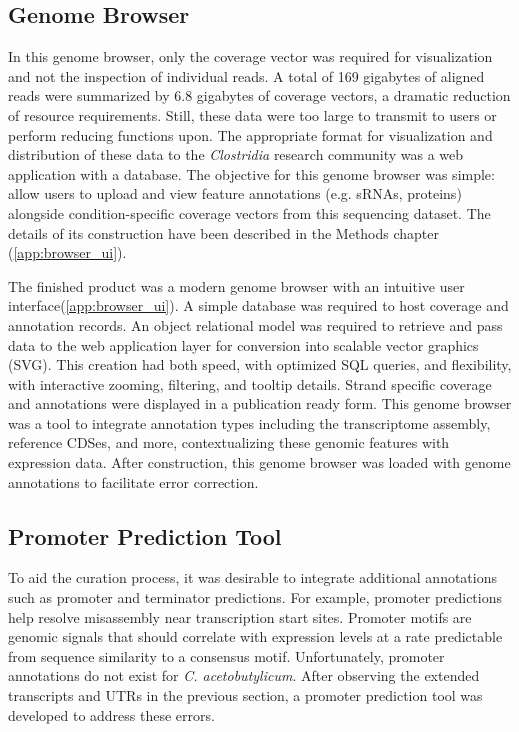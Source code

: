 \subsection{Genome Browser}
In this genome browser, only the coverage vector was required for visualization and not the inspection of individual reads. A total of 169 gigabytes of aligned reads were summarized by 6.8 gigabytes of coverage vectors, a dramatic reduction of resource requirements. Still, these data were too large to transmit to users or perform reducing functions upon. The appropriate format for visualization and distribution of these data to the \textit{Clostridia} research community was a web application with a database. The objective for this genome browser was simple: allow users to upload and view feature annotations (e.g. sRNAs, proteins) alongside condition-specific coverage vectors from this sequencing dataset. The details of its construction have been described in the Methods chapter (\ref{app:browser_ui}).

The finished product was a modern genome browser with an intuitive user interface(\ref{app:browser_ui}). A simple database was required to host coverage and annotation records. An object relational model was required to retrieve and pass data to the web application layer for conversion into scalable vector graphics (SVG). This creation had both speed, with optimized SQL queries, and flexibility, with interactive zooming, filtering, and tooltip details. Strand specific coverage and annotations were displayed in a publication ready form. This genome browser was a tool to integrate annotation types including the transcriptome assembly, reference CDSes, and more, contextualizing these genomic features with expression data. After construction, this genome browser was loaded with genome annotations to facilitate error correction.

\subsection{Promoter Prediction Tool}
To aid the curation process, it was desirable to integrate additional annotations such as promoter and terminator predictions. For example, promoter predictions help resolve misassembly near transcription start sites. Promoter motifs are genomic signals that should correlate with expression levels at a rate predictable from sequence similarity to a consensus motif. Unfortunately, promoter annotations do not exist for \textit{C. acetobutylicum}. After observing the extended transcripts and UTRs in the previous section, a promoter prediction tool was developed to address these errors.

